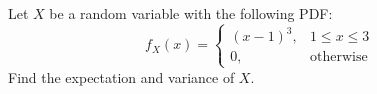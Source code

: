 \begin{problem}
Let $X$ be a random variable with the following PDF:
\[
f_X(x) = \begin{cases}
    (x-1)^3, & 1 \le x \le 3 \\
    0, & \text{otherwise}
\end{cases}
\]
Find the expectation and variance of $X$. 
\end{problem}

